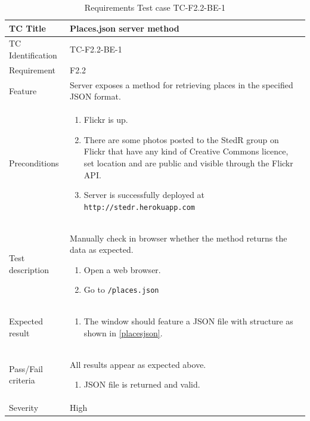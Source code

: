 \documentclass[11pt]{book}
\begin{document}
\begin{table}
  \begin{tabular}{| p{3cm} | p{9.5cm} |} \hline 
    TC Title              & Places.json server method \\ \hline 
    TC Identification     & TC-F2.2-BE-1 \\ \hline 
    Requirement           & F2.2 \\ \hline 
    Feature               & Server exposes a method for retrieving places in the specified JSON format. \\ \hline 
    Preconditions         & \begin{enumerate}
                              \item Flickr is up.
                              \item There are some photos posted to the StedR group on Flickr that have any kind of
                               Creative Commons licence, set location and are public and visible through the Flickr API.
                              \item Server is successfully deployed at \texttt{http://stedr.herokuapp.com}
                            \end{enumerate} \\ \hline 

    Test description      & Manually check in browser whether the method returns the data as expected.

                            \begin{enumerate}
                              \item Open a web browser.
                              \item Go to \texttt{/places.json}
                            \end{enumerate} \\ \hline 
    Expected result       & \begin{enumerate}
                              \item The window should feature a JSON file with structure as shown in \ref{placesjson}.
                            \end{enumerate} \\ \hline 
    Pass/Fail criteria    & All results appear as expected above.
                            \begin{enumerate}
                              \item JSON file is returned and valid.
                            \end{enumerate} \\ \hline 
    Severity              & High \\ \hline 
  \end{tabular}
  \caption{Requirements Test case TC-F2.2-BE-1}
  \label{tab:TCF2.2BE1}
\end{table}
\end{document}

